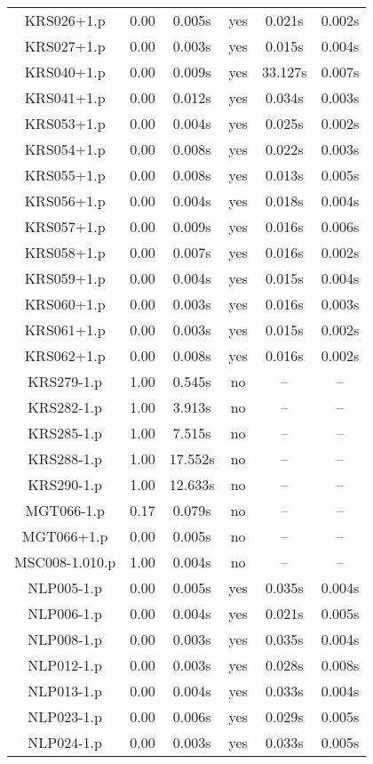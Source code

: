 \begin{center}
\begin{longtable}{||c | c | c | c | c | c||}
KRS026+1.p & 0.00 & 0.005s & yes & 0.021s & 0.002s \\
KRS027+1.p & 0.00 & 0.003s & yes & 0.015s & 0.004s \\
KRS040+1.p & 0.00 & 0.009s & yes & 33.127s & 0.007s \\
KRS041+1.p & 0.00 & 0.012s & yes & 0.034s & 0.003s \\
KRS053+1.p & 0.00 & 0.004s & yes & 0.025s & 0.002s \\
KRS054+1.p & 0.00 & 0.008s & yes & 0.022s & 0.003s \\
KRS055+1.p & 0.00 & 0.008s & yes & 0.013s & 0.005s \\
KRS056+1.p & 0.00 & 0.004s & yes & 0.018s & 0.004s \\
KRS057+1.p & 0.00 & 0.009s & yes & 0.016s & 0.006s \\
KRS058+1.p & 0.00 & 0.007s & yes & 0.016s & 0.002s \\
KRS059+1.p & 0.00 & 0.004s & yes & 0.015s & 0.004s \\
KRS060+1.p & 0.00 & 0.003s & yes & 0.016s & 0.003s \\
KRS061+1.p & 0.00 & 0.003s & yes & 0.015s & 0.002s \\
KRS062+1.p & 0.00 & 0.008s & yes & 0.016s & 0.002s \\
KRS279-1.p & 1.00 & 0.545s & no & -- & -- \\
KRS282-1.p & 1.00 & 3.913s & no & -- & -- \\
KRS285-1.p & 1.00 & 7.515s & no & -- & -- \\
KRS288-1.p & 1.00 & 17.552s & no & -- & -- \\
KRS290-1.p & 1.00 & 12.633s & no & -- & -- \\
MGT066-1.p & 0.17 & 0.079s & no & -- & -- \\
MGT066+1.p & 0.00 & 0.005s & no & -- & -- \\
MSC008-1.010.p & 1.00 & 0.004s & no & -- & -- \\
NLP005-1.p & 0.00 & 0.005s & yes & 0.035s & 0.004s \\
NLP006-1.p & 0.00 & 0.004s & yes & 0.021s & 0.005s \\
NLP008-1.p & 0.00 & 0.003s & yes & 0.035s & 0.004s \\
NLP012-1.p & 0.00 & 0.003s & yes & 0.028s & 0.008s \\
NLP013-1.p & 0.00 & 0.004s & yes & 0.033s & 0.004s \\
NLP023-1.p & 0.00 & 0.006s & yes & 0.029s & 0.005s \\
NLP024-1.p & 0.00 & 0.003s & yes & 0.033s & 0.005s \\

\end{longtable}
\end{center}
